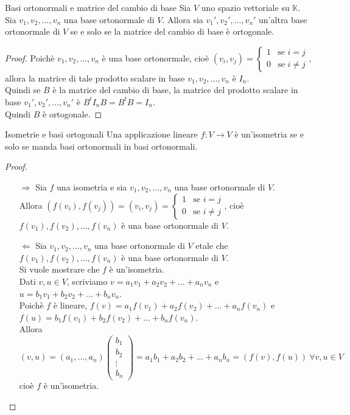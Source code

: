 \documentclass[a4paper]{article}
\theoremstyle{definition}
\begin{document}
	\begin{teo}{Basi ortonormali e matrice del cambio di base}
		Sia $V$ uno spazio vettoriale su $\mathbb{K}$. \\
		Sia $v_1, v_2, ..., v_n$ una base ortonormale di $V$. Allora sia $v_1', v_2', ..., v_n'$ un'altra base ortonormale di $V$
		se e solo se la matrice del cambio di base è ortogonale.
	\end{teo}
	\begin{proof}
		Poichè $v_1, v_2, ..., v_n$ è una base ortonormale, cioè $(v_i, v_j) = \begin{cases}
			1 & \text{se } i = j \\
			0 & \text{se } i \ne j
		\end{cases}$, allora la matrice di tale prodotto scalare in base $v_1, v_2, ..., v_n$ è $I_n$. \\
		Quindi se $B$ è la matrice del cambio di base, la matrice del prodotto scalare in base $v_1', v_2', ..., v_n'$ è $B^tI_nB = B^tB = I_n$. \\
		Quindi $B$ è ortogonale.
	\end{proof}

	\begin{teo}{Isometrie e basi ortogonali}
		Una applicazione lineare $f: V \to V$ è un'isometria se e solo se manda basi ortonormali in basi ortonormali.
	\end{teo}
	\begin{proof}
		\begin{itemize}
			\item[$\Rightarrow$] Sia $f$ una isometria e sia $v_1, v_2, ..., v_n$ una base ortonormale di $V$. \\
			Allora $(f(v_i), f(v_j)) = (v_i, v_j) = \begin{cases}
				1 & \text{se } i = j \\
				0 & \text{se } i \ne j
			\end{cases}$, cioè $f(v_1), f(v_2), ..., f(v_n)$ è una base ortonormale di $V$.
			\item[$\Leftarrow$] Sia $v_1, v_2, ..., v_n$ una base ortonormale di $V$ etale che $f(v_1), f(v_2), ..., f(v_n)$ è una base ortonormale di $V$. \\
			Si vuole mostrare che $f$ è un'isometria. \\
			Dati $v, u \in V$, scriviamo $v = a_1v_1 + a_2v_2 + ... + a_nv_n$ e $u = b_1v_1 + b_2v_2 + ... + b_nv_n$. \\
			Poichè $f$ è lineare, $f(v) = a_1f(v_1) + a_2f(v_2) + ... + a_nf(v_n)$ e $f(u) = b_1f(v_1) + b_2f(v_2) + ... + b_nf(v_n)$. \\
			Allora $(v, u) = (a_1, ..., a_n) \begin{pmatrix}
				b_1 \\
				b_2 \\
				\vdots \\
				b_n
			\end{pmatrix} = a_1b_1 + a_2b_2 + ... + a_nb_n = (f(v), f(u)) \ \forall v, u \in V$ cioè $f$ è un'isometria.
		\end{itemize}
	\end{proof}
\end{document}
